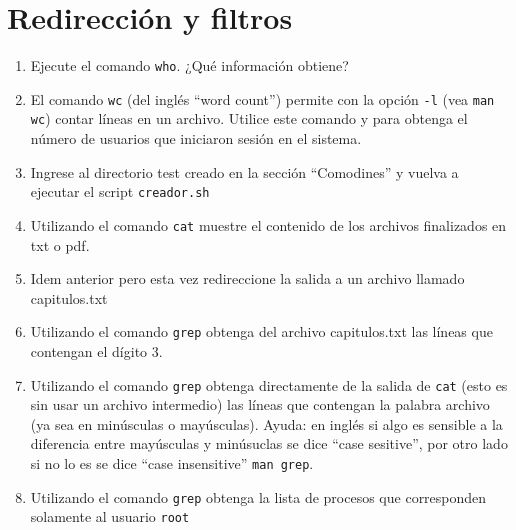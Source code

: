 \documentclass[12pt]{article}
\begin{document}
\section*{Redirección y filtros}
\begin{enumerate}
\item Ejecute el comando \texttt{who}. ¿Qué información obtiene?
\item El comando \texttt{wc} (del inglés ``word count'') permite con la opción \texttt{-l}  (vea \texttt{man wc}) contar 
líneas en un archivo. Utilice este comando y \texttt{\textbar} para obtenga el número de usuarios que iniciaron 
sesión en el sistema. 
\item Ingrese al directorio test creado en la sección ``Comodines'' y vuelva a ejecutar el script \texttt{creador.sh}
\item Utilizando el comando \texttt{cat} muestre el contenido de los archivos finalizados en txt o pdf. 
\item Idem anterior pero esta vez redireccione la salida a un archivo llamado capitulos.txt
\item Utilizando el comando \texttt{grep} obtenga del archivo capitulos.txt las líneas que contengan el dígito 3. 
\item Utilizando el comando \texttt{grep} obtenga directamente de la salida de \texttt{cat} (esto es sin usar un archivo 
intermedio) las líneas que contengan la palabra archivo (ya sea en minúsculas o mayúsculas). Ayuda: en inglés 
si algo es sensible a la diferencia entre mayúsculas y minúsuclas se dice ``case sesitive'', por otro lado 
si no lo es se dice ``case insensitive'' \texttt{man grep}.  
\item Utilizando el comando \texttt{grep} obtenga la lista de procesos que corresponden solamente al usuario \texttt{root}



\end{enumerate}
\end{document}

